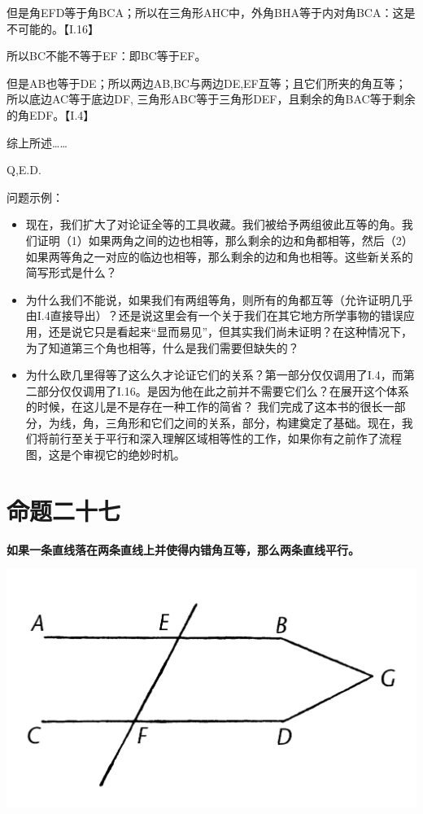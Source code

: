 \documentclass[
]{book}
\providecommand{\tightlist}{%
  \setlength{\itemsep}{0pt}\setlength{\parskip}{0pt}}
\begin{document}
但是角EFD等于角BCA；所以在三角形AHC中，外角BHA等于内对角BCA：这是不可能的。【I.16】

所以BC不能不等于EF：即BC等于EF。

但是AB也等于DE；所以两边AB,BC与两边DE,EF互等；且它们所夹的角互等；所以底边AC等于底边DF, 三角形ABC等于三角形DEF，且剩余的角BAC等于剩余的角EDF。【I.4】

综上所述\ldots\ldots{}

Q,E.D.

问题示例：

\begin{itemize}
\tightlist
\item
  现在，我们扩大了对论证全等的工具收藏。我们被给予两组彼此互等的角。我们证明（1）如果两角之间的边也相等，那么剩余的边和角都相等，然后（2）如果两等角之一对应的临边也相等，那么剩余的边和角也相等。这些新关系的简写形式是什么？
\item
  为什么我们不能说，如果我们有两组等角，则所有的角都互等（允许证明几乎由I.4直接导出）？还是说这里会有一个关于我们在其它地方所学事物的错误应用，还是说它只是看起来``显而易见''，但其实我们尚未证明？在这种情况下，为了知道第三个角也相等，什么是我们需要但缺失的？
\item
  为什么欧几里得等了这么久才论证它们的关系？第一部分仅仅调用了I.4，而第二部分仅仅调用了I.16。是因为他在此之前并不需要它们么？在展开这个体系的时候，在这儿是不是存在一种工作的简省？
  我们完成了这本书的很长一部分，为线，角，三角形和它们之间的关系，部分，构建奠定了基础。现在，我们将前行至关于平行和深入理解区域相等性的工作，如果你有之前作了流程图，这是个审视它的绝妙时机。
\end{itemize}

\hypertarget{ux547dux9898ux4e8cux5341ux4e03}{%
\section{命题二十七}\label{ux547dux9898ux4e8cux5341ux4e03}}

\textbf{如果一条直线落在两条直线上并使得内错角互等，那么两条直线平行。}

\includegraphics[width=0.5\linewidth]{./image/img508}
\end{document}
